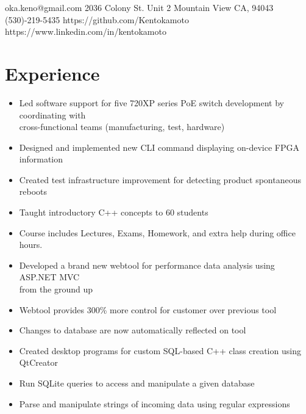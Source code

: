 \documentclass{Custom_CV}
\begin{document}
{oka.keno@gmail.com}
{2036 Colony St. Unit 2}
{Mountain View CA, 94043}
{(530)-219-5435}
{https://github.com/Kentokamoto}
{https://www.linkedin.com/in/kentokamoto}

\hfill %
\section{Experience}
\begin{itemize}[noitemsep]
    \item Led software support for five 720XP series PoE switch development by coordinating with\\ cross-functional teams (manufacturing, test, hardware)
    \item Designed and implemented new CLI command displaying on-device FPGA information
    \item Created test infrastructure improvement for detecting product spontaneous reboots
\end{itemize}

\begin{itemize}[noitemsep]
    \item Taught introductory C++ concepts to 60 students
    \item Course includes Lectures, Exams, Homework, and extra help during office hours.
\end{itemize}
\begin{itemize}[rightmargin=\dimexpr\linewidth-15cm-\leftmargin\relax,noitemsep]
    \item Developed a brand new webtool for performance data analysis using ASP.NET MVC\\ from the ground up
    \item Webtool provides 300\% more control for customer over previous tool
    \item Changes to database are now automatically reflected on tool
\end{itemize}
\begin{itemize}[rightmargin=\dimexpr\linewidth-15cm-\leftmargin\relax,noitemsep]
\item Created desktop programs for custom SQL-based C++ class creation using QtCreator
\item Run SQLite queries to access and manipulate a given database
\item Parse and manipulate strings of incoming data using regular expressions
\end{itemize}
\end{document}
